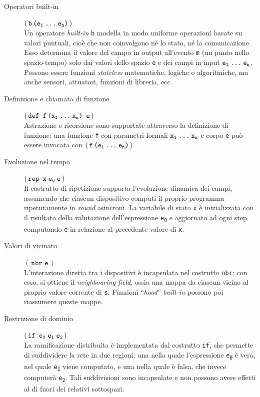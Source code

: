 \begin{description}

  \item[Operatori built-in] \((\,\texttt{b\,(e\textsubscript{1}\:\dots{}\:e\textsubscript{n})}\,)\) \\
    Un operatore \emph{built-in} \texttt{b} modella in modo uniforme operazioni basate su valori puntuali, cioè che non coinvolgono né lo stato, né la comunicazione.
    Esso determina il valore del campo in output all'evento \texttt{m} (un punto nello spazio-tempo) solo dai valori dello spazio \texttt{e}
    e dei campi in input \(\texttt{e\textsubscript{1}\:\dots{}\:e\textsubscript{n}}\).
    Possono essere funzioni \emph{stateless} matematiche, logiche o algoritmiche, ma anche sensori, attuatori, funzioni di libreria, ecc.

  \item[Definizione e chiamata di funzione] \((\,\texttt{def\ f\,(x\textsubscript{1}\:\dots{}\:x\textsubscript{n})\ e}\,)\) \\
    Astrazione e ricorsione sono supportate attraverso la definizione di funzione:
    una funzione \texttt{f} con parametri formali \(\texttt{x\textsubscript{1}\:\dots{}\:x\textsubscript{n}}\) e corpo \texttt{e}
    può essere invocata con \((\,\texttt{f\,(e\textsubscript{1}\:\dots{}\:e\textsubscript{n})}\,)\).

  \item[Evoluzione nel tempo] \((\,\texttt{rep\ x\;e\textsubscript{0}\;e}\,)\) \\
    Il costrutto di ripetizione supporta l'evoluzione dinamica dei campi, assumendo che ciascun dispositivo computi il proprio programma ripetutamente in \emph{round} asincroni.
    La variabile di stato \texttt{x} è inizializzata con il risultato della valutazione dell'espressione \texttt{e\textsubscript{0}} e aggiornato ad ogni step computando \texttt{e} in relazione al precedente valore di \texttt{x}.

  \item[Valori di vicinato] \((\,\texttt{nbr\ e}\,)\) \\
    L'interazione diretta tra i dispositivi è incapsulata nel costrutto \texttt{nbr};
    con esso, si ottiene il \emph{neighbouring field}, ossia una mappa da ciascun vicino al proprio valore corrente di \texttt{s}.
    Funzioni ``\emph{hood}'' \emph{built-in} possono poi riassumere queste mappe.

  \item[Restrizione di dominio] \((\,\texttt{if\ e\textsubscript{0}\;e\textsubscript{1}\;e\textsubscript{2}}\,)\) \\
    La ramificazione distribuita è implementata dal costrutto \texttt{if}, che permette di suddividere la rete in due regioni:
    una nella quale l'espressione \texttt{e\textsubscript{0}} è vera, nel quale \texttt{e\textsubscript{1}} viene computato, e una nella quale è falsa, che invece computerà \texttt{e\textsubscript{2}}.
    Tali suddivisioni sono incapsulate e non possono avere effetti al di fuori dei relativi sottospazi.
\end{description}

